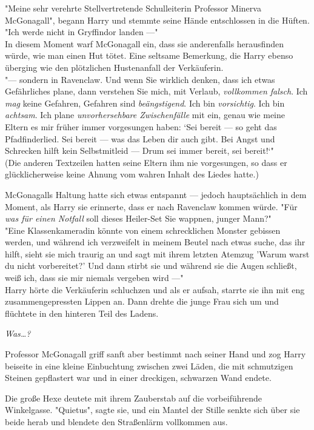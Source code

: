 {"Meine sehr verehrte Stellvertretende Schulleiterin Professor Minerva McGonagall", begann Harry und stemmte seine Hände entschlossen in die Hüften. "Ich werde nicht in Gryffindor landen ---"\\ In diesem Moment warf McGonagall ein, dass sie anderenfalls herausfinden würde, wie man einen Hut tötet. Eine seltsame Bemerkung, die Harry ebenso überging wie den plötzlichen Hustenanfall der Verkäuferin.\\ "--- sondern in Ravenclaw. Und wenn Sie wirklich denken, dass ich etwas Gefährliches plane, dann verstehen Sie mich, mit Verlaub, \emph{vollkommen falsch}. Ich \emph{mag} keine Gefahren, Gefahren sind \emph{beängstigend}. Ich bin \emph{vorsichtig}. Ich bin \emph{achtsam}. Ich plane \emph{unvorhersehbare Zwischenfälle} mit ein, genau wie meine Eltern es mir früher immer vorgesungen haben: `Sei bereit --- so geht das Pfadfinderlied. Sei bereit --- was das Leben dir auch gibt. Bei Angst und Schrecken hilft kein Selbstmitleid --- Drum sei immer bereit, sei bereit!`"\\ (Die anderen Textzeilen hatten seine Eltern ihm nie vorgesungen, so dass er glücklicherweise keine Ahnung vom wahren Inhalt des Liedes hatte.)

McGonagalls Haltung hatte sich etwas entspannt --- jedoch hauptsächlich in dem Moment, als Harry sie erinnerte, dass er nach Ravenclaw kommen würde. "Für \emph{was für einen Notfall} soll dieses Heiler-Set Sie wappnen, junger Mann?"\\ "Eine Klassenkameradin könnte von einem schrecklichen Monster gebissen werden, und während ich verzweifelt in meinem Beutel nach etwas suche, das ihr hilft, sieht sie mich traurig an und sagt mit ihrem letzten Atemzug 'Warum warst du nicht vorbereitet?' Und dann stirbt sie und während sie die Augen schließt, weiß ich, dass sie mir niemals vergeben wird ---"\\ Harry hörte die Verkäuferin schluchzen und als er aufsah, starrte sie ihn mit eng zusammengepressten Lippen an. Dann drehte die junge Frau sich um und flüchtete in den hinteren Teil des Ladens.

\emph{Was…?}

Professor McGonagall griff sanft aber bestimmt nach seiner Hand und zog Harry beiseite in eine kleine Einbuchtung zwischen zwei Läden, die mit schmutzigen Steinen gepflastert war und in einer dreckigen, schwarzen Wand endete.

Die große Hexe deutete mit ihrem Zauberstab auf die vorbeiführende Winkelgasse. "Quietus", sagte sie, und ein Mantel der Stille senkte sich über sie beide herab und blendete den Straßenlärm vollkommen aus.

}
